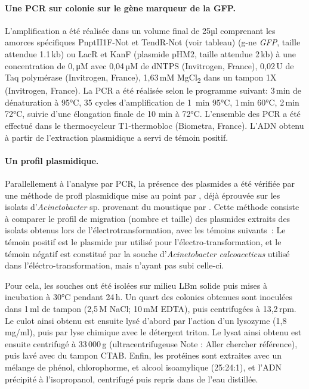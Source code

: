 \paragraph{Une PCR sur colonie sur le gène marqueur de la GFP.}
L’amplification a été réalisée dans un volume final de 25µl comprenant les amorces spécifiques PnptII1F-Not et TendR-Not (voir tableau)
(g-ne \textit{GFP}, taille attendue 1.1\,kb) ou LacR et KanF (plasmide pHM2, taille attendue 2\,kb) à une concentration de 0,\,μM avec 0,04\,µM de dNTPS (Invitrogen, France), 0,02\,U de Taq polymérase (Invitrogen, France), 1,63\,mM MgCl\textsubscript{2} dans un tampon 1X (Invitrogen, France).
La PCR a été réalisée selon le programme suivant: 3\,min de dénaturation à 95°C, 35 cycles d’amplification de 1\ min 95°C, 1\,min 60°C, 2\,min 72°C, suivie d’une élongation finale de 10 min à 72°C.
L’ensemble des PCR a été effectué dans le thermocycleur T1-thermobloc (Biometra, France).
L’ADN obtenu à partir de l’extraction plasmidique a servi de témoin positif.

\paragraph{Un profil plasmidique.}
Parallellement à l'analyse par PCR, la présence des plasmides a été vérifiée par une méthode de profl plasmidique mise au point par \textcite{seifert1994}, déjà éprouvée sur les isolats d'\textit{Acinetobacter} sp. provenant du moustique par \textcite{minard2013}.
Cette méthode consiste à comparer le profil de migration (nombre et taille) des plasmides extraits des isolats obtenus lors de l'électrotransformation, avec les témoins suivants~: Le témoin positif est le plasmide pur utilisé pour l'électro-transformation, et le témoin négatif est constitué par la souche d'\textit{Acinetobacter calcoaceticus} utilisé dans l'éléctro-transformation, mais n'ayant pas subi celle-ci.

Pour cela, les souches ont été isolées sur milieu LBm solide puis mises à incubation à 30°C pendant 24\,h.
Un quart des colonies obtenues sont inoculées dans 1\,ml de tampon (2,5\,M NaCl; 10\,mM EDTA), puis centrifugées à 13,2\,rpm.
Le culot ainsi obtenu est ensuite lysé d'abord par l'action d'un lysozyme (1,8\,mg/ml), puis par lyse chimique avec le détergent triton.
Le lysat ainsi obtenu est ensuite centrifugé à 33\,000\,g (ultracentrifugeuse Note : Aller chercher référence), puis lavé avec du tampon CTAB.
Enfin, les protéines sont extraites avec un mélange de phénol, chlorophorme, et alcool isoamylique (25:24:1), et l'ADN précipité à l'isopropanol, centrifugé puis repris dans de l'eau distillée.

